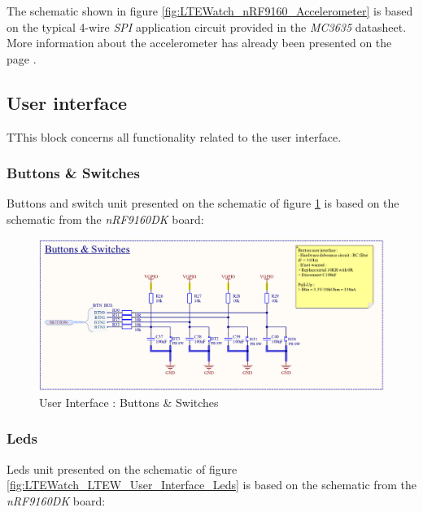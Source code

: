 \documentclass[report.tex]{subfiles}
\begin{document}
The schematic shown in figure \ref{fig:LTEWatch_nRF9160_Accelerometer} is based on the typical 4-wire \textit{SPI} application circuit provided in the \textit{MC3635}\cite{MC3635} datasheet. More information about the accelerometer has already been presented on the page \pageref{sec:accl_sel}.


\pagebreak
\subsection{User interface}

TThis block concerns all functionality  related to the user interface.

\subsubsection{Buttons \& Switches}

Buttons and switch unit presented on the schematic of figure \ref{fig:LTEWatch_LTEW_User_Interface_Buttons_Switches} is based on the schematic from the \textit{nRF9160DK}\cite{nRF9160DK} board:

\begin{figure}[H]
	\centering
	\includegraphics[width=1\textwidth]{Include/Figure/Hardware/LTEWatch_LTEW_User_Interface_Buttons_Switches}
	\caption{User Interface : Buttons \& Switches}
	\label{fig:LTEWatch_LTEW_User_Interface_Buttons_Switches}
\end{figure}

\subsubsection{Leds}

Leds unit presented on the schematic of figure \ref{fig:LTEWatch_LTEW_User_Interface_Leds} is based on the schematic from the \textit{nRF9160DK}\cite{nRF9160DK} board:
\end{document}
